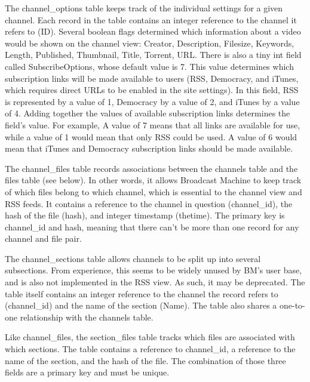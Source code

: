 \documentclass[a4paper,12pt]{report}
\begin{document}
The channel\_options table keeps track of the individual settings for a given channel. Each record in the table contains an integer reference to the channel it refers to (ID). Several boolean flags determined which information about a video would be shown on the channel view: Creator, Description, Filesize, Keywords, Length, Published, Thumbnail, Title, Torrent, URL. There is also a tiny int field called SubscribeOptions, whose default value is 7. This value determines which subscription links will be made available to users (RSS, Democracy, and iTunes, which requires direct URLs to be enabled in the site settings). In this field, RSS is represented by a value of 1, Democracy by a value of 2, and iTunes by a value of 4. Adding together the values of available subscription links determines the field's value. For example, A value of 7 means that all links are available for use, while a value of 1 would mean that only RSS could be used. A value of 6 would mean that iTunes and Democracy subscription links should be made available. 


The channel\_files table records associations between the channels table and the files table (see below). In other words, it allows Broadcast Machine to keep track of which files belong to which channel, which is essential to the channel view and RSS feeds. It contains a reference to the channel in question (channel\_id), the hash of the file (hash), and integer timestamp (thetime). The primary key is channel\_id and hash, meaning that there can't be more than one record for any channel and file pair.


The channel\_sections table allows channels to be split up into several subsections. From experience, this seems to be widely unused by BM's user base, and is also not implemented in the RSS view. As such, it may be deprecated. The table itself contains an integer reference to the channel the record refers to (channel\_id) and the name of the section (Name). The table also shares a one-to-one relationship with the channels table.


Like channel\_files, the section\_files table tracks which files are associated with which sections. The table contains a reference to channel\_id, a reference to the name of the section, and the hash of the file. The combination of those three fields are a primary key and must be unique.
\end{document}

